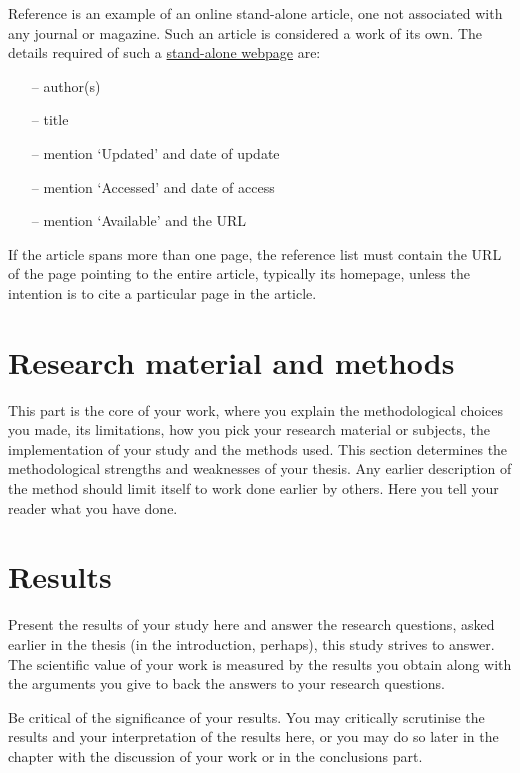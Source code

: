 \documentclass[english, 12pt, a4paper, biz, utf8, a-2b, online]{aaltothesis}
\begin{document}
\noindent
Reference \cite{webpage} is an example of an online stand-alone article, one not
associated with any journal or magazine. Such an article is considered a work of
its own. The details required of such a \underline{stand-alone webpage} 
are:
\begin{itemize}
\setlength{\itemsep}{-3pt}
\item[--] author(s)
\item[--] title
\item[--] mention `Updated' and date of update
\item[--] mention `Accessed' and date of access
\item[--] mention `Available' and the URL
\end{itemize}
If the article spans more than one page, the reference list must contain the URL
of the page pointing to the entire article, typically its homepage, unless the 
intention is to cite a particular page in the article.


\clearpage

\section{Research material and methods}

This part is the core of your work, where you explain the methodological choices
you made, its limitations, how you pick your research material or subjects, the 
implementation of your study and the methods used. This section determines the 
methodological strengths and weaknesses of your thesis. Any earlier description 
of the method should limit itself to work done earlier by others. Here you tell 
your reader what you have done.

\clearpage

\section{Results}

Present the results of your study here and answer the research questions, asked 
earlier in the thesis (in the introduction, perhaps), this study strives to 
answer. The scientific value of your work is measured by the results you obtain 
along with the arguments you give to back the answers to your research 
questions.

Be critical of the significance of your results. You may critically scrutinise 
the results and your interpretation of the results here, or you may do so later 
in the chapter with the discussion of your work or in the conclusions part.
\end{document}
